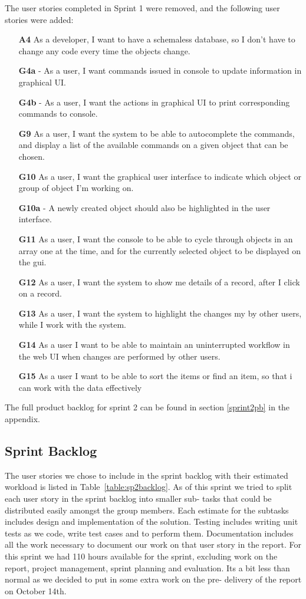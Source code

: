 The user stories completed in Sprint 1 were removed, and the following user stories were added:

\begin{itemize}
  \item [\textbf{A4}] As a developer, I want to have a schemaless database, so I don't have to change any code every time the objects change.
  \item [\textbf{G4a}] - As a user, I want commands issued in console to update information in graphical UI.
  \item [\textbf{G4b}] - As a user, I want the actions in graphical UI to print corresponding commands to console.
  \item [\textbf{G9}] As a user, I want the system to be able to autocomplete the commands, and display a list of the available commands on a given object that can be chosen.
  \item [\textbf{G10}] As a user, I want the graphical user interface to indicate which object or group of object I’m working on.
  \item [\textbf{G10a}] - A newly created object should also be highlighted in the user interface.
  \item [\textbf{G11}] As a user, I want the console to be able to cycle through objects in an array one at the time, and for the currently selected object to be displayed on the gui.
  \item [\textbf{G12}] As a user, I want the system to show me details of a record, after I click on a record.
  \item [\textbf{G13}] As a user, I want the system to highlight the changes my by other users, while I work with the system.
  \item [\textbf{G14}] As a user I want to be able to maintain an uninterrupted workflow in the web UI when changes are performed by other users.
  \item [\textbf{G15}] As a user I want to be able to sort the items or find an item, so that i can work with the data effectively
\end{itemize}

The full product backlog for sprint 2 can be found in section \ref{sprint2pb} in the appendix.

\subsection{Sprint Backlog}
The user stories we chose to include in the sprint backlog with their estimated workload is listed in Table~\ref{table:sp2backlog}. As of this sprint we tried to split each user story in the sprint backlog into smaller sub- tasks that could be distributed easily amongst the group members. Each estimate for the subtasks includes design and implementation of the solution. Testing includes writing unit tests as we code, write test cases and to perform them. Documentation includes all the work necessary to document our work on that user story in the report. For this sprint we had 110 hours available for the sprint, excluding work on the report, project management, sprint planning and evaluation. Its a bit less than normal as we decided to put in some extra work on the pre- delivery of the report on October 14th.

